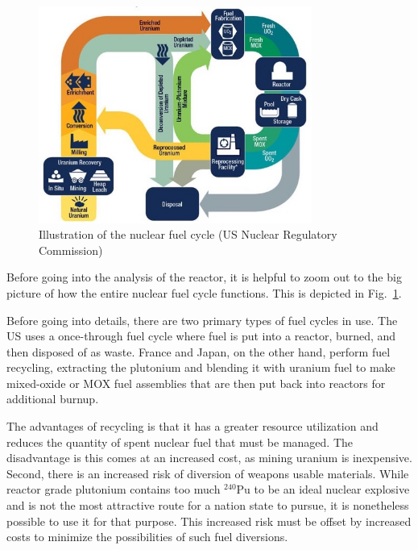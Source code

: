 \begin{figure}[tb!]
\begin{center}
\includegraphics[width=0.8\textwidth]{./Figures/NRCFuelCycle.jpg}
\caption{Illustration of the nuclear fuel cycle (US Nuclear Regulatory Commission)}
\label{Fig:kinetics_nuclearFuelCycle}
\end{center}
\end{figure}

Before going into the analysis of the reactor, it is helpful to zoom out to the big picture of how the entire nuclear fuel cycle functions. This is depicted in Fig.~\ref{Fig:kinetics_nuclearFuelCycle}.

Before going into details, there are two primary types of fuel cycles in use. The US uses a once-through fuel cycle where fuel is put into a reactor, burned, and then disposed of as waste. France and Japan, on the other hand, perform fuel recycling, extracting the plutonium and blending it with uranium fuel to make mixed-oxide or MOX fuel assemblies that are then put back into reactors for additional burnup. 

The advantages of recycling is that it has a greater resource utilization and reduces the quantity of spent nuclear fuel that must be managed. The disadvantage is this comes at an increased cost, as mining uranium is inexpensive. Second, there is an increased risk of diversion of weapons usable materials. While reactor grade plutonium contains too much $^{240}$Pu to be an ideal nuclear explosive and is not the most attractive route for a nation state to pursue, it is nonetheless possible to use it for that purpose. This increased risk must be offset by increased costs to minimize the possibilities of such fuel diversions.

